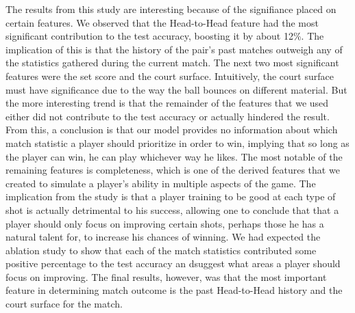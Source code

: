 \documentclass[conference]{IEEEtran}
\begin{document}
	The results from this study are interesting because of the signifiance placed on certain features. We observed that the Head-to-Head feature had the most significant contribution to the test accuracy, boosting it by about 12\%. The implication of this is that the history of the pair's past matches outweigh any of the statistics gathered during the current match. The next two most significant features were the set score and the court surface. Intuitively, the court surface must have significance due to the way the ball bounces on different material. But the more interesting trend is that the remainder of the features that we used either did not contribute to the test accuracy or actually hindered the result. From this, a conclusion is that our model provides no information about which match statistic a player should prioritize in order to win, implying that so long as the player can win, he can play whichever way he likes. The most notable of the remaining features is completeness, which is one of the derived features that we created to simulate a player's ability in multiple aspects of the game. The implication from the study is that a player training to be good at each type of shot is actually detrimental to his success, allowing one to conclude that that a player should only focus on improving certain shots, perhaps those he has a natural talent for, to increase his chances of winning. 
	We had expected the ablation study to show that each of the match statistics contributed some positive percentage to the test accuracy an dsuggest what areas a player should focus on improving. The final results, however, was that the most important feature in determining match outcome is the past Head-to-Head history and the court surface for the match.
%
%
\end{document}
